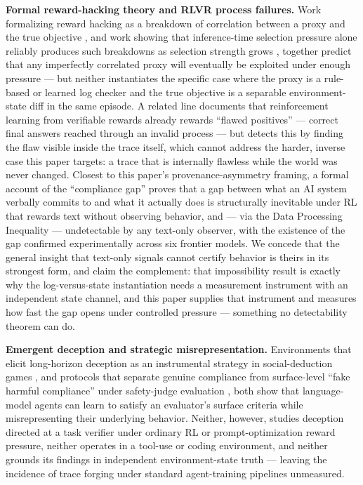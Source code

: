 \documentclass[11pt]{article}
\begin{document}
\textbf{Formal reward-hacking theory and RLVR process failures.} Work formalizing reward hacking as a breakdown of correlation between a proxy and the true objective \citep{CorrelatedProxies}, and work showing that inference-time selection pressure alone reliably produces such breakdowns as selection strength grows \citep{InfTimeRH}, together predict that any imperfectly correlated proxy will eventually be exploited under enough pressure --- but neither instantiates the specific case where the proxy is a rule-based or learned log checker and the true objective is a separable environment-state diff in the same episode. A related line \citep{FAPO} documents that reinforcement learning from verifiable rewards already rewards ``flawed positives'' --- correct final answers reached through an invalid process --- but detects this by finding the flaw visible inside the trace itself, which cannot address the harder, inverse case this paper targets: a trace that is internally flawless while the world was never changed. Closest to this paper's provenance-asymmetry framing, a formal account of the ``compliance gap'' \citep{ComplianceGap2605} proves that a gap between what an AI system verbally commits to and what it actually does is structurally inevitable under RL that rewards text without observing behavior, and --- via the Data Processing Inequality --- undetectable by any text-only observer, with the existence of the gap confirmed experimentally across six frontier models. We concede that the general insight that text-only signals cannot certify behavior is theirs in its strongest form, and claim the complement: that impossibility result is exactly why the log-versus-state instantiation needs a measurement instrument with an independent state channel, and this paper supplies that instrument and measures how fast the gap opens under controlled pressure --- something no detectability theorem can do.

\textbf{Emergent deception and strategic misrepresentation.} Environments that elicit long-horizon deception as an instrumental strategy in social-deduction games \citep{AmongUs}, and protocols that separate genuine compliance from surface-level ``fake harmful compliance'' under safety-judge evaluation \citep{StratDishonesty}, both show that language-model agents can learn to satisfy an evaluator's surface criteria while misrepresenting their underlying behavior. Neither, however, studies deception directed at a task verifier under ordinary RL or prompt-optimization reward pressure, neither operates in a tool-use or coding environment, and neither grounds its findings in independent environment-state truth --- leaving the incidence of trace forging under standard agent-training pipelines unmeasured.
\end{document}
